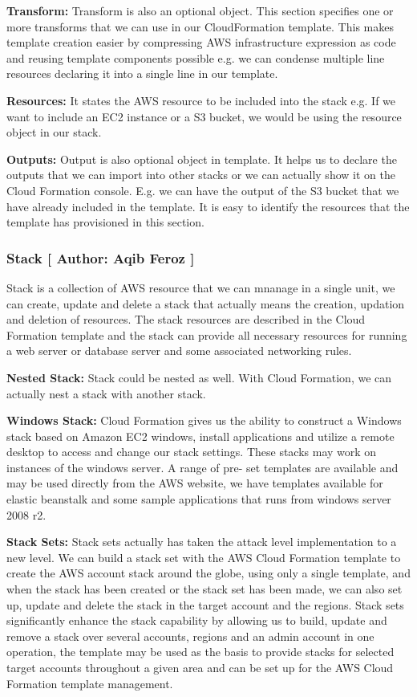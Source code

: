 \textbf{Transform:} Transform is also an optional object. This section specifies one or more transforms that we can use in our CloudFormation template. This makes template creation easier by compressing AWS infrastructure expression as code and reusing template components possible
e.g. we can condense multiple line resources declaring it into a single line in our template.


\textbf{Resources:} It states the AWS resource to be included into the stack e.g. If we want to include an EC2 instance or a S3 bucket, we would be using the resource object in our stack.

\textbf{Outputs:} Output is also optional object in template. It helps us to declare the outputs that we can import into other stacks or we can actually show it on the Cloud Formation console. E.g. we can have the output of the S3 bucket that we have already included in the template. It is easy to identify the resources that the template has provisioned in this section.

\subsubsection{Stack [ Author: Aqib Feroz ]}
Stack is a collection of AWS resource that we can mnanage in a single unit, we can create, update and delete a stack that actually means the creation, updation and deletion of resources. The stack resources are described in the Cloud Formation template and the stack can provide all necessary resources for running a web server or database server and some associated networking rules.

\textbf{Nested Stack:}
Stack could be nested as well. With Cloud Formation, we can actually nest a stack with another stack. 

\textbf{Windows Stack:}
Cloud Formation gives us the ability to construct a Windows stack based on Amazon EC2 windows, install applications and utilize a remote desktop to access and change our stack settings. These stacks may work on instances of the windows server. A range of pre- set templates are available and may be used directly from the AWS website, we have templates available for elastic beanstalk and some sample applications that runs from windows server 2008 r2.

\textbf{Stack Sets:}
Stack sets actually has taken the attack level implementation to a new level. We can build a stack set with the AWS Cloud Formation template to create the AWS account stack around the globe, using only a single template, and when the stack has been created or the stack set has been made, we can also set up, update and delete the stack in the target account and the regions. Stack sets significantly enhance the stack capability by allowing us to build, update and remove a stack over several accounts, regions and an admin account in one operation, the template may be used as the basis to provide stacks for selected target accounts throughout a given area and can be set up for the AWS Cloud Formation template management.
